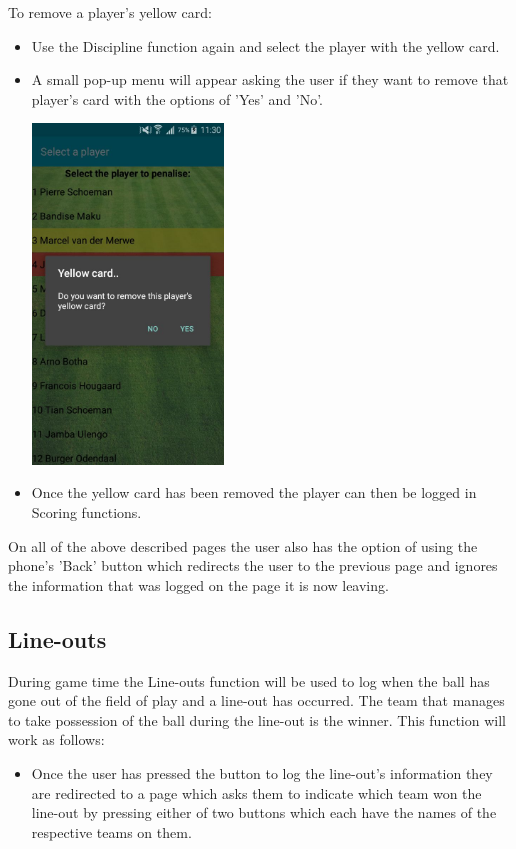 \documentclass[hidelinks,a4paper,12pt]{article}
\begin{document}
	To remove a player's yellow card:
	\begin{itemize}
		\item Use the Discipline function again and select the player with the yellow card.
		\item A small pop-up menu will appear asking the user if they want to remove that player's card with the options of 'Yes' and 'No'.

		\begin{center}
  			\includegraphics[width=0.4\textwidth] {./images/remove_discipline.jpg}\\[0.4cm]
		\end{center}

		\item Once the yellow card has been removed the player can then be logged in Scoring functions.
	\end{itemize}

	On all of the above described pages the user also has the option of using the phone's  'Back' button which redirects the user to the previous page and ignores the information that was logged on the page it is now leaving.

\newpage

	\subsection{Line-outs}
	During game time the Line-outs function will be used to log when the ball has gone out of the field of play and a line-out has occurred. The team that manages to take possession of the ball during the line-out is the winner. This function will work as follows:
	\begin{itemize}
		\item Once the user has pressed the button to log the line-out's information they are redirected to a page which asks them to indicate which team won the line-out by pressing either of two buttons which each have the names of the respective teams on them.
	\end{itemize}
\end{document}
